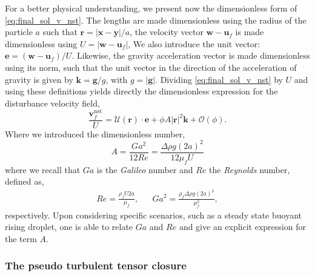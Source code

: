 For a better physical understanding, we present now the dimensionless form of \ref{eq:final_sol_v_nst}. 
The lengths are made dimensionless using the radius of the particle $a$ such that $\textbf{r} = |\textbf{x} - \textbf{y}|/a$, the velocity vector $\textbf{w} - \textbf{u}_f$ is made dimensionless using $U = |\textbf{w} - \textbf{u}_f|$, 
We also introduce the unit vector: $\textbf{e} = (\textbf{w} - \textbf{u}_f)/U$. 
Likewise, the gravity acceleration vector is made dimensionless using its norm, such that the unit vector in the direction of the acceleration of gravity is given by $\textbf{k} = \textbf{g} / g$, with $g = |\textbf{g}|$. 
Dividing \ref{eq:final_sol_v_nst} by $U$ and using these definitions yields directly the dimensionless expression for the disturbance velocity field, 
\begin{equation}
    \frac{\textbf{v}^\text{nst}_f}{U}
    =
    \mathcal{U}(\textbf{r})\cdot 
    \textbf{e}
    + \phi A |\textbf{r}|^2 \textbf{k}
    + \mathcal{O}(\phi). 
    \label{eq:v_nst_solution_adim}
\end{equation}
Where we introduced the dimensionless number, 
\begin{equation}
    A = \frac{Ga^2}{12 Re}=\frac{\Delta \rho g (2a)^2}{12 \mu_f U}
    \label{eq:A_general}
\end{equation}
where we recall that $Ga$ is the \textit{Galileo} number and $Re$ the \textit{Reynolds} number, defined as,  
\begin{align*}
    Re= \frac{\rho_f U 2a}{\mu_f},
    &&
    Ga^2 = \frac{\rho_f \Delta\rho g (2a)^3}{\mu_f^2},
\end{align*}
respectively. 
Upon considering specific scenarios, such as a steady state buoyant rising droplet, one is able to relate $Ga$ and $Re$ and give an explicit expression for the term $A$.
 



\subsubsection{The pseudo turbulent tensor closure}

